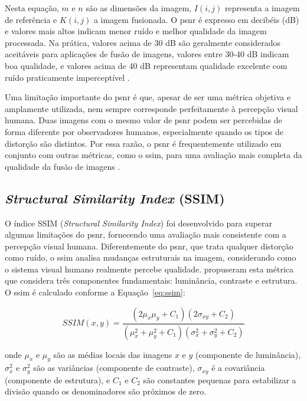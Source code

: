 Nesta equação, $m$ e $n$ são as dimensões da imagem, $I(i,j)$ representa a imagem de referência e $K(i,j)$ a imagem fusionada. O \gls{psnr} é expresso em decibéis (dB) e valores mais altos indicam menor ruído e melhor qualidade da imagem processada. Na prática, valores acima de 30 dB são geralmente considerados aceitáveis para aplicações de fusão de imagens, valores entre 30-40 dB indicam boa qualidade, e valores acima de 40 dB representam qualidade excelente com ruído praticamente imperceptível \cite{hore2010image}.

Uma limitação importante do \gls{psnr} é que, apesar de ser uma métrica objetiva e amplamente utilizada, nem sempre corresponde perfeitamente à percepção visual humana. Duas imagens com o mesmo valor de \gls{psnr} podem ser percebidas de forma diferente por observadores humanos, especialmente quando os tipos de distorção são distintos. Por essa razão, o \gls{psnr} é frequentemente utilizado em conjunto com outras métricas, como o \gls{ssim}, para uma avaliação mais completa da qualidade da fusão de imagens \cite{hore2010image}.

\subsection*{\textit{Structural Similarity Index} (SSIM)}

O índice SSIM (\textit{Structural Similarity Index}) foi desenvolvido para superar algumas limitações do \gls{psnr}, fornecendo uma avaliação mais consistente com a percepção visual humana. Diferentemente do \gls{psnr}, que trata qualquer distorção como ruído, o \gls{ssim} analisa mudanças estruturais na imagem, considerando como o sistema visual humano realmente percebe qualidade.  propuseram esta métrica que considera três componentes fundamentais: luminância, contraste e estrutura. O \gls{ssim} é calculado conforme a Equação~\ref{eq:ssim}:

\begin{equation}
\label{eq:ssim}
SSIM(x,y) = \frac{(2\mu_x\mu_y + C_1)(2\sigma_{xy} + C_2)}{(\mu^2_x + \mu^2_y + C_1)(\sigma^2_x + \sigma^2_y + C_2)}
\end{equation}

\noindent onde $\mu_x$ e $\mu_y$ são as médias locais das imagens $x$ e $y$ (componente de luminância), $\sigma^2_x$ e $\sigma^2_y$ são as variâncias (componente de contraste), $\sigma_{xy}$ é a covariância (componente de estrutura), e $C_1$ e $C_2$ são constantes pequenas para estabilizar a divisão quando os denominadores são próximos de zero.

